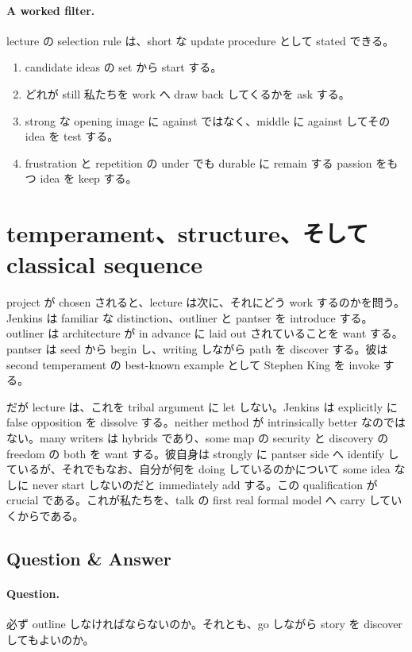 \paragraph{A worked filter.} lecture の selection rule は、short な update procedure として stated できる。

\begin{enumerate}
\item candidate ideas の set から start する。
\item どれが still 私たちを work へ draw back してくるかを ask する。
\item strong な opening image に against ではなく、middle に against してその idea を test する。
\item frustration と repetition の under でも durable に remain する passion をもつ idea を keep する。
\end{enumerate}

\section{temperament、structure、そして classical sequence}

project が chosen されると、lecture は次に、それにどう work するのかを問う。Jenkins は familiar な distinction、outliner と pantser を introduce する。outliner は architecture が in advance に laid out されていることを want する。pantser は seed から begin し、writing しながら path を discover する。彼は second temperament の best-known example として Stephen King を invoke する。

だが lecture は、これを tribal argument に let しない。Jenkins は explicitly に false opposition を dissolve する。neither method が intrinsically better なのではない。many writers は hybrids であり、some map の security と discovery の freedom の both を want する。彼自身は strongly に pantser side へ identify しているが、それでもなお、自分が何を doing しているのかについて some idea なしに never start しないのだと immediately add する。この qualification が crucial である。これが私たちを、talk の first real formal model へ carry していくからである。

\subsection{Question \& Answer}

\paragraph{Question.} 必ず outline しなければならないのか。それとも、go しながら story を discover してもよいのか。

